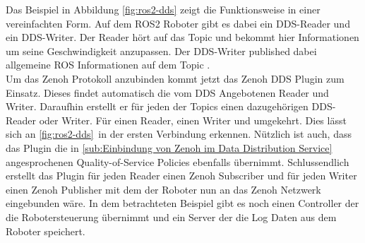 Das Beispiel in Abbildung \ref{fig:ros2-dds} zeigt die Funktionsweise in einer vereinfachten Form. Auf dem ROS2 Roboter gibt es dabei ein DDS-Reader und ein DDS-Writer. Der Reader hört auf das Topic  und bekommt hier Informationen um seine Geschwindigkeit anzupassen. Der DDS-Writer published dabei allgemeine ROS Informationen auf dem Topic .\\
Um das Zenoh Protokoll anzubinden kommt jetzt das Zenoh DDS Plugin zum Einsatz. Dieses findet automatisch die vom DDS Angebotenen Reader und Writer. Daraufhin erstellt er für jeden der Topics einen dazugehörigen DDS-Reader oder Writer. Für einen Reader, einen Writer und umgekehrt. Dies lässt sich an \ref{fig:ros2-dds} in der ersten Verbindung erkennen. Nützlich ist auch, dass das Plugin die in \ref{sub:Einbindung von Zenoh im Data Distribution Service} angesprochenen Quality-of-Service Policies ebenfalls übernimmt. Schlussendlich erstellt das Plugin für jeden Reader einen Zenoh Subscriber und für jeden Writer einen Zenoh Publisher mit dem der Roboter nun an das Zenoh Netzwerk eingebunden wäre. In dem betrachteten Beispiel gibt es noch einen Controller der die Robotersteuerung übernimmt und ein Server der die Log Daten aus dem Roboter speichert.


